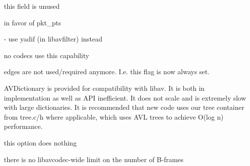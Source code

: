 \begin{DoxyRefList}
\item[\label{deprecated__deprecated000026}%
\hypertarget{deprecated__deprecated000026}{}%
Member \hyperlink{struct_a_v_frame_a65f7f4bcff7f6ffb020138d839bbb3f6}{A\+V\+Frame\+:\+:hwaccel\+\_\+picture\+\_\+private} ]this field is unused  
\item[\label{deprecated__deprecated000025}%
\hypertarget{deprecated__deprecated000025}{}%
Member \hyperlink{struct_a_v_frame_ab54a78c51318c8c678e545b1f3d6fddd}{A\+V\+Frame\+:\+:reordered\+\_\+opaque} ]in favor of pkt\+\_\+pts  
\item[\label{deprecated__deprecated000011}%
\hypertarget{deprecated__deprecated000011}{}%
Member \hyperlink{group__lavc__picture_gafae4ce3eea8607e0c0c14ef73ff1902f}{avpicture\+\_\+deinterlace} (\hyperlink{struct_a_v_picture}{A\+V\+Picture} $\ast$dst, const \hyperlink{struct_a_v_picture}{A\+V\+Picture} $\ast$src, enum A\+V\+Pixel\+Format pix\+\_\+fmt, int width, int height)]-\/ use yadif (in libavfilter) instead  
\item[\label{deprecated__deprecated000003}%
\hypertarget{deprecated__deprecated000003}{}%
Member \hyperlink{group__lavc__core_ga19dfa49f18ea643e695ee530d060f7de}{C\+O\+D\+E\+C\+\_\+\+C\+A\+P\+\_\+\+N\+E\+G\+\_\+\+L\+I\+N\+E\+S\+I\+Z\+ES} ]no codecs use this capability  
\item[\label{deprecated__deprecated000002}%
\hypertarget{deprecated__deprecated000002}{}%
Member \hyperlink{group__lavc__core_ga59f363ca5d22ad82adab3a5e6f520d10}{C\+O\+D\+E\+C\+\_\+\+F\+L\+A\+G\+\_\+\+E\+M\+U\+\_\+\+E\+D\+GE} ]edges are not used/required anymore. I.\+e. this flag is now always set.  
\item[\label{deprecated__deprecated000024}%
\hypertarget{deprecated__deprecated000024}{}%
File \hyperlink{dict_8h}{dict.h} ]A\+V\+Dictionary is provided for compatibility with libav. It is both in implementation as well as A\+PI inefficient. It does not scale and is extremely slow with large dictionaries. It is recommended that new code uses our tree container from tree.\+c/h where applicable, which uses A\+VL trees to achieve O(log n) performance.  
\item[\label{deprecated__deprecated000019}%
\hypertarget{deprecated__deprecated000019}{}%
Member \hyperlink{avcodec_8h_a89c8bc430a198997dcd844d49f0ecc37}{F\+F\+\_\+\+D\+E\+B\+U\+G\+\_\+\+MV} ]this option does nothing  
\item[\label{deprecated__deprecated000001}%
\hypertarget{deprecated__deprecated000001}{}%
Member \hyperlink{group__lavc__core_gafe5eaf646b3390c6ae8a7a66cd4b7896}{F\+F\+\_\+\+M\+A\+X\+\_\+\+B\+\_\+\+F\+R\+A\+M\+ES} ]there is no libavcodec-\/wide limit on the number of B-\/frames  

\end{DoxyRefList}

